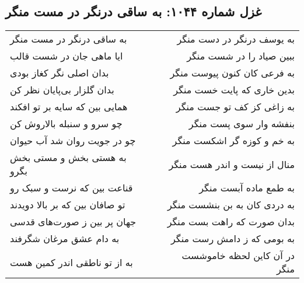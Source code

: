 \begin{center}
\section*{غزل شماره ۱۰۴۴: به ساقی درنگر در مست منگر}
\label{sec:1044}
\begin{longtable}{l p{0.5cm} r}
به ساقی درنگر در مست منگر
&&
به یوسف درنگر در دست منگر
\\
ایا ماهی جان در شست قالب
&&
ببین صیاد را در شست منگر
\\
بدان اصلی نگر کغاز بودی
&&
به فرعی کان کنون پیوست منگر
\\
بدان گلزار بی‌پایان نظر کن
&&
بدین خاری که پایت خست منگر
\\
همایی بین که سایه بر تو افکند
&&
به زاغی کز کف تو جست منگر
\\
چو سرو و سنبله بالاروش کن
&&
بنفشه وار سوی پست منگر
\\
چو در جویت روان شد آب حیوان
&&
به خم و کوزه گر اشکست منگر
\\
به هستی بخش و مستی بخش بگرو
&&
منال از نیست و اندر هست منگر
\\
قناعت بین که نرست و سبک رو
&&
به طمع ماده آبست منگر
\\
تو صافان بین که بر بالا دویدند
&&
به دردی کان به بن بنشست منگر
\\
جهان پر بین ز صورت‌های قدسی
&&
بدان صورت که راهت بست منگر
\\
به دام عشق مرغان شگرفند
&&
به بومی که ز دامش رست منگر
\\
به از تو ناطقی اندر کمین هست
&&
در آن کاین لحظه خاموشست منگر
\\
\end{longtable}
\end{center}
